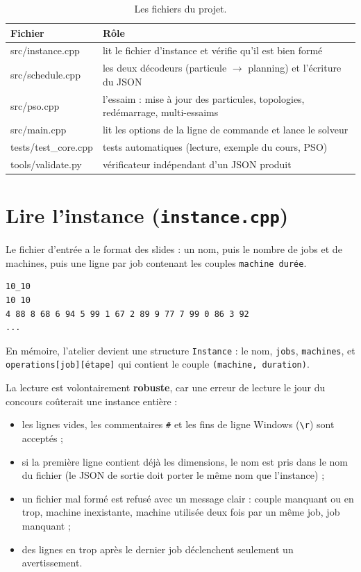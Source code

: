 \documentclass[11pt,a4paper]{article}
\begin{document}
\begin{table}[h]
\centering
\caption{Les fichiers du projet.}
\begin{tabular}{>{\ttfamily}l p{10.5cm}}
\toprule
\textrm{Fichier} & Rôle\\
\midrule
src/instance.cpp & lit le fichier d'instance et vérifie qu'il est bien formé\\
src/schedule.cpp & les deux décodeurs (particule $\to$ planning) et l'écriture du JSON\\
src/pso.cpp      & l'essaim : mise à jour des particules, topologies, redémarrage, multi-essaims\\
src/main.cpp     & lit les options de la ligne de commande et lance le solveur\\
tests/test\_core.cpp & tests automatiques (lecture, exemple du cours, PSO)\\
tools/validate.py & vérificateur indépendant d'un JSON produit\\
\bottomrule
\end{tabular}
\end{table}

\section{Lire l'instance (\texttt{instance.cpp})}

Le fichier d'entrée a le format des slides : un nom, puis le nombre de jobs et de
machines, puis une ligne par job contenant les couples \texttt{machine durée}.

\begin{lstlisting}[style=shell]
10_10
10 10
4 88 8 68 6 94 5 99 1 67 2 89 9 77 7 99 0 86 3 92
...
\end{lstlisting}

En mémoire, l'atelier devient une structure \texttt{Instance} : le nom, \texttt{jobs},
\texttt{machines}, et \texttt{operations[job][étape]} qui contient le couple
\texttt{(machine, duration)}.

La lecture est volontairement \textbf{robuste}, car une erreur de lecture le jour du
concours coûterait une instance entière :
\begin{itemize}
  \item les lignes vides, les commentaires \texttt{\#} et les fins de ligne Windows
        (\texttt{\textbackslash r}) sont acceptés ;
  \item si la première ligne contient déjà les dimensions, le nom est pris dans le nom du
        fichier (le JSON de sortie doit porter le même nom que l'instance) ;
  \item un fichier mal formé est refusé avec un message clair : couple manquant ou en
        trop, machine inexistante, machine utilisée deux fois par un même job, job manquant ;
  \item des lignes en trop après le dernier job déclenchent seulement un avertissement.
\end{itemize}
\end{document}
